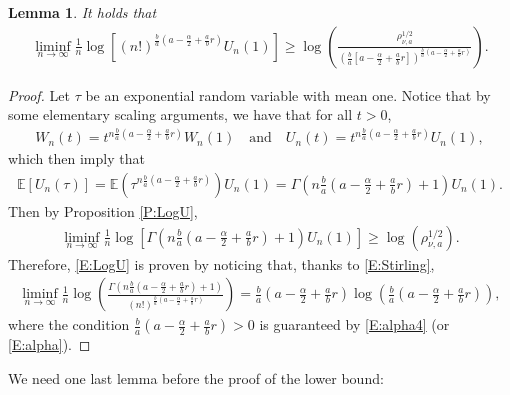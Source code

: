 \documentclass[12pt]{report}
\theoremstyle{plain}
\newtheorem{lemma}[theorem]{Lemma}
\theoremstyle{definition}
\numberwithin{equation}{section}
\begin{document}
\begin{lemma} \label{L:LogU}
	It holds that
	\begin{align} \label{E:LogU}
	\liminf_{n\to \infty} \frac{1}{n}\log \left[ (n!)^{ \frac{b}{a}(a-\frac{\alpha}{2} + \frac{a}{b}r)} U_n(1) \right]
	\ge \log\left( \frac{\rho_{\nu,a}^{1/2}}{ \left(\frac{b}{a}[ a-\frac{\alpha}{2} + \frac{a}{b}r ]\right)^{\frac{b}{a}(a-\frac{\alpha}{2} + \frac{a}{b}r)} }\right).
	\end{align}
\end{lemma}
\begin{proof}
	Let $\tau$ be an exponential random variable with mean one. Notice that by some elementary scaling
	arguments, we have that for all $t>0$,
	\begin{align}
	\label{E:WU}
	W_n(t) = t^{n\frac{b}{a}\left(a- \frac{\alpha}{2}+\frac{a}{b}r \right)} W_n(1) \quad \text{and} \quad
	U_n(t) = t^{n\frac{b}{a}\left(a- \frac{\alpha}{2}+\frac{a}{b}r \right)} U_n(1),
	\end{align}
	which then imply that
	\begin{align*}
	\mathbb{E}\left[ U_n(\tau) \right] = \mathbb{E}\left( \tau^{n\frac{b}{a}(a-\frac{\alpha}{2}+\frac{a}{b}r)} \right) U_n(1)
	= \Gamma\left( n\frac{b}{a}\left(a-\frac{\alpha}{2} +\frac{a}{b}r \right) +1 \right) U_n(1).
	\end{align*}
	Then by Proposition \ref{P:LogU},
	\begin{align}\label{E:lb1}
	\liminf_{n\to \infty} \frac{1}{n} \log \left[ \Gamma\left( n\frac{b}{a}\left(a-\frac{\alpha}{2} +\frac{a}{b}r \right) +1 \right) U_n(1) \right] \ge \log\left(\rho_{\nu, a}^{1/2}\right).
	\end{align}
	Therefore, \eqref{E:LogU} is proven by noticing that, thanks to \eqref{E:Stirling},
	\begin{align*}
	\liminf_{n\to \infty} \frac{1}{n} \log \left( \frac{ \Gamma\left( n\frac{b}{a}\left(a-\frac{\alpha}{2} +\frac{a}{b}r \right) +1 \right) }{ (n!)^{\frac{b}{a}\left(a-\frac{\alpha}{2} +\frac{a}{b}r \right)} } \right )
	= \frac{b}{a}\left(a-\frac{\alpha}{2} +\frac{a}{b}r \right) \log\left( \frac{b}{a}\left(a-\frac{\alpha}{2} +\frac{a}{b}r \right) \right),
	\end{align*}
	where the condition $\frac{b}{a}\left(a-\frac{\alpha}{2} +\frac{a}{b}r \right) >0$ is guaranteed
	by \eqref{E:alpha4} (or \eqref{E:alpha}).
\end{proof} 

We need one last lemma before the proof of the lower bound:
\end{document}

